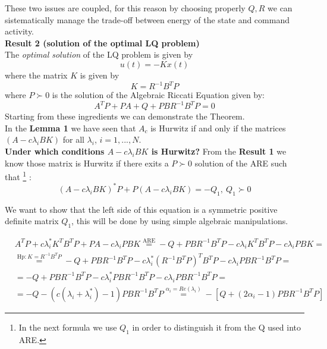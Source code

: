 These two issues are coupled, for this reason by choosing properly $Q, R$ we can sistematically manage the trade-off between energy of the state and command activity.\\

\noindent
\textbf{Result 2 (solution of the optimal LQ problem)}\\
The \textit{optimal solution} of the LQ problem is given by
\begin{equation}
    u(t) = -K x(t)
\end{equation}
where the matrix $K$ is given by 
\begin{equation}
    K=R^{-1} B^T P
\end{equation}
where $P \succ 0$ is the solution of the Algebraic Riccati Equation given by:
\begin{equation}
    A^T P + PA + Q + PBR^{-1}B^TP=0
\end{equation} 
\noindent
Starting from these ingredients we can demonstrate the Theorem.\\


In the \textbf{Lemma 1} we have seen that $A_c$ is Hurwitz if and only if the matrices $(A-c\lambda_i BK)$ for all $\lambda_i$, $i=1,..., N$. \\
\textbf{Under which conditions $A-c\lambda_iBK$ is Hurwitz?} From the \textbf{Result 1} we know those matrix is Hurwitz if there exits a $P\succ0$ solution of the ARE such that{
    \footnote[9]{In the next formula we use $Q_1$ in order to distinguish it from the Q used into ARE.}
}:
\begin{equation}
    (A-c\lambda_iBK)^* P + P(A-c\lambda_iBK)=-Q_1, \ Q_1 \succ 0
\end{equation}

\indent
We want to show that the left side of this equation is a symmetric positive definite matrix $Q_1$, this will be done by using simple algebraic manipulations.

\begin{align*}
    &A^T P + c\lambda_i^* K^T B^T P + PA - c\lambda_i PBK
    \overset{\text{ARE}}{=} -Q + PBR^{-1}B^T P - c\lambda_i K^T B^T P - c\lambda_iPBK =\\
    &\overset{\text{Hp:}\ K=R^{-1} B^T P}{=}
    -Q + PBR^{-1}B^TP-c\lambda_i^* (R^{-1}B^T P)^T B^T P - c \lambda_i P B R^{-1} B^T P = \\
    & = -Q + PBR^{-1} B^T P - c\lambda_i^* P B R^{-1}B^T P - c\lambda_i P B R^{-1}B^T P = \\
    & = -Q -(c(\lambda_i + \lambda_i^*)-1)P B R^{-1}B^T P \overset{\alpha_i = Re(\lambda_i)}{=} 
    - [Q+(2\alpha_i-1)P B R^{-1}B^T P]
\end{align*}

